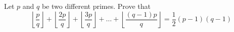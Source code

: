 Let $p$ and $q$ be two different primes. Prove that\[\left\lfloor\frac{p}{q}\right\rfloor+\left\lfloor\frac{2p}{q}\right\rfloor+\left\lfloor\frac{3p}{q}\right\rfloor+\ldots +\left\lfloor\frac{(q-1)p}{q}\right\rfloor=\frac{1}{2}(p-1)(q-1) \]